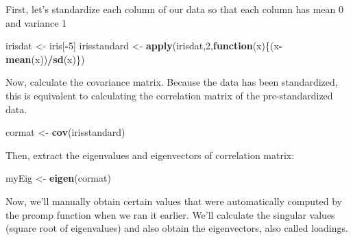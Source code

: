\documentclass[
]{book}
\newenvironment{Shaded}{\begin{snugshade}}{\end{snugshade}}
\newcommand{\ControlFlowTok}[1]{\textcolor[rgb]{0.13,0.29,0.53}{\textbf{#1}}}
\newcommand{\DecValTok}[1]{\textcolor[rgb]{0.00,0.00,0.81}{#1}}
\newcommand{\KeywordTok}[1]{\textcolor[rgb]{0.13,0.29,0.53}{\textbf{#1}}}
\newcommand{\NormalTok}[1]{#1}
\newcommand{\OperatorTok}[1]{\textcolor[rgb]{0.81,0.36,0.00}{\textbf{#1}}}
\newcommand{\StringTok}[1]{\textcolor[rgb]{0.31,0.60,0.02}{#1}}
\begin{document}
First, let's standardize each column of our data so that each column has mean 0 and variance 1

\begin{Shaded}
\begin{Highlighting}[]
\NormalTok{irisdat \textless{}{-}}\StringTok{ }\NormalTok{iris[}\OperatorTok{{-}}\DecValTok{5}\NormalTok{]}
\NormalTok{irisstandard \textless{}{-}}\StringTok{ }\KeywordTok{apply}\NormalTok{(irisdat,}\DecValTok{2}\NormalTok{,}\ControlFlowTok{function}\NormalTok{(x)\{(x}\OperatorTok{{-}}\KeywordTok{mean}\NormalTok{(x))}\OperatorTok{/}\KeywordTok{sd}\NormalTok{(x)\})}
\end{Highlighting}
\end{Shaded}

Now, calculate the covariance matrix. Because the data has been standardized, this is equivalent to calculating the correlation matrix of the pre-standardized data.

\begin{Shaded}
\begin{Highlighting}[]
\NormalTok{cormat \textless{}{-}}\StringTok{ }\KeywordTok{cov}\NormalTok{(irisstandard)}
\end{Highlighting}
\end{Shaded}

Then, extract the eigenvalues and eigenvectors of correlation matrix:

\begin{Shaded}
\begin{Highlighting}[]
\NormalTok{myEig \textless{}{-}}\StringTok{ }\KeywordTok{eigen}\NormalTok{(cormat)}
\end{Highlighting}
\end{Shaded}

Now, we'll manually obtain certain values that were automatically computed by the prcomp function when we ran it earlier. We'll calculate the singular values (square root of eigenvalues) and also obtain the eigenvectors, also called loadings.

\begin{Shaded}
\end{Shaded}
\end{document}
